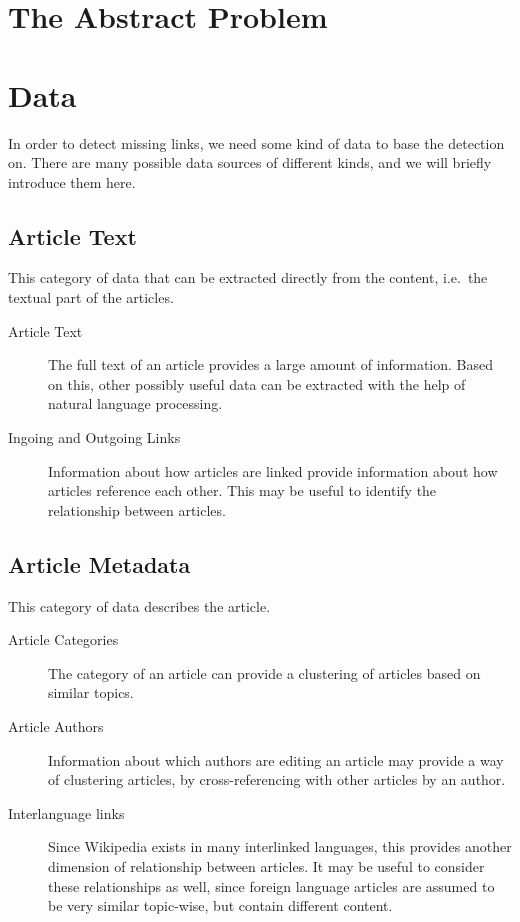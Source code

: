 \section{The Abstract Problem} 




\section{Data}\label{sec:data}
In order to detect missing links, we need some kind of data to base the detection on. There are many possible data sources of different kinds, and we will briefly introduce them here.


\subsection{Article Text}
This category of data that can be extracted directly from the content, i.e.\ the textual part of the articles.
\begin{description}
  \item[Article Text] The full text of an article provides a large amount of information. Based on this, other possibly useful data can be extracted with the help of natural language processing.
  \item[Ingoing and Outgoing Links] Information about how articles are linked provide information about how articles reference each other. This may be useful to identify the relationship between articles.
\end{description}

\subsection{Article Metadata}
This category of data describes the article.
\begin{description}
  \item[Article Categories] The category of an article can provide a clustering of articles based on similar topics.
  \item[Article Authors] Information about which authors are editing an article may provide a way of clustering articles, by cross-referencing with other articles by an author.
  \item[Interlanguage links] Since Wikipedia exists in many interlinked languages, this provides another dimension of relationship between articles. It may be useful to consider these relationships as well, since foreign language articles are assumed to be very similar topic-wise, but contain different content.
\end{description}

